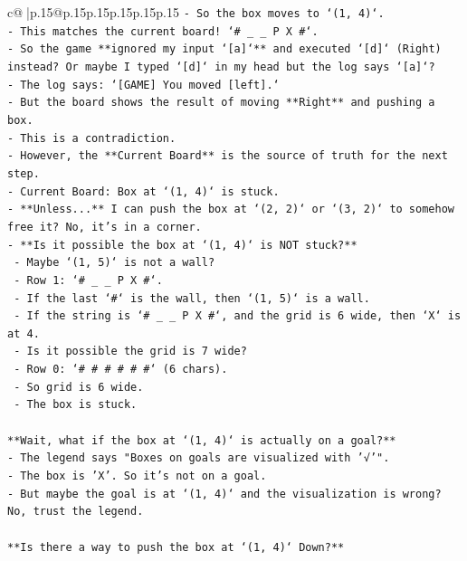 \documentclass{article}
\begin{document}
{\begin{supertabular}{c@{$\;$}|p{.15\linewidth}@{}p{.15\linewidth}p{.15\linewidth}p{.15\linewidth}p{.15\linewidth}p{.15\linewidth}}
{{{\texttt{{-} So the box moves to `(1, 4)`.} \\
\texttt{{-} This matches the current board! `\# \_ \_ P X \#`.} \\
\texttt{{-} So the game **ignored my input `{[}a{]}`** and executed `{[}d{]}` (Right) instead? Or maybe I typed `{[}d{]}` in my head but the log says `{[}a{]}`?} \\
\texttt{{-} The log says: `{[}GAME{]} You moved {[}left{]}.`} \\
\texttt{{-} But the board shows the result of moving **Right** and pushing a box.} \\
\texttt{{-} This is a contradiction.} \\
\texttt{{-} However, the **Current Board** is the source of truth for the next step.} \\
\texttt{{-} Current Board: Box at `(1, 4)` is stuck.} \\
\texttt{{-} **Unless...** I can push the box at `(2, 2)` or `(3, 2)` to somehow free it? No, it's in a corner.} \\
\texttt{{-} **Is it possible the box at `(1, 4)` is NOT stuck?**} \\
\texttt{  {-} Maybe `(1, 5)` is not a wall?} \\
\texttt{  {-} Row 1: `\# \_ \_ P X \#`.} \\
\texttt{  {-} If the last `\#` is the wall, then `(1, 5)` is a wall.} \\
\texttt{  {-} If the string is `\# \_ \_ P X \#`, and the grid is 6 wide, then `X` is at 4.} \\
\texttt{  {-} Is it possible the grid is 7 wide?} \\
\texttt{  {-} Row 0: `\# \# \# \# \# \#` (6 chars).} \\
\texttt{  {-} So grid is 6 wide.} \\
\texttt{  {-} The box is stuck.} \\
\\ 
\texttt{**Wait, what if the box at `(1, 4)` is actually on a goal?**} \\
\texttt{{-} The legend says "Boxes on goals are visualized with '√'".} \\
\texttt{{-} The box is 'X'. So it's not on a goal.} \\
\texttt{{-} But maybe the goal is at `(1, 4)` and the visualization is wrong? No, trust the legend.} \\
\\ 
\texttt{**Is there a way to push the box at `(1, 4)` Down?**} \\
}}}
\end{supertabular}}
\end{document}
